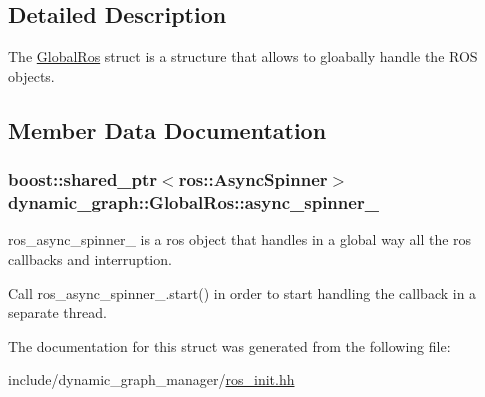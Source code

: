 \subsection{Detailed Description}
The \hyperlink{structdynamic__graph_1_1GlobalRos}{Global\+Ros} struct is a structure that allows to gloabally handle the R\+OS objects. 

\subsection{Member Data Documentation}
\subsubsection[{\texorpdfstring{async\+\_\+spinner\+\_\+}{async_spinner_}}]{\setlength{\rightskip}{0pt plus 5cm}boost\+::shared\+\_\+ptr$<$ros\+::\+Async\+Spinner$>$ dynamic\+\_\+graph\+::\+Global\+Ros\+::async\+\_\+spinner\+\_\+}\hypertarget{structdynamic__graph_1_1GlobalRos_a9ad45d4ac3a50e943d3f2cb24f8281a3}{}\label{structdynamic__graph_1_1GlobalRos_a9ad45d4ac3a50e943d3f2cb24f8281a3}


ros\+\_\+async\+\_\+spinner\+\_\+ is a ros object that handles in a global way all the ros callbacks and interruption. 

Call ros\+\_\+async\+\_\+spinner\+\_\+.\+start() in order to start handling the callback in a separate thread. 

The documentation for this struct was generated from the following file\+:\begin{DoxyCompactItemize}
\item 
include/dynamic\+\_\+graph\+\_\+manager/\hyperlink{ros__init_8hh}{ros\+\_\+init.\+hh}\end{DoxyCompactItemize}
